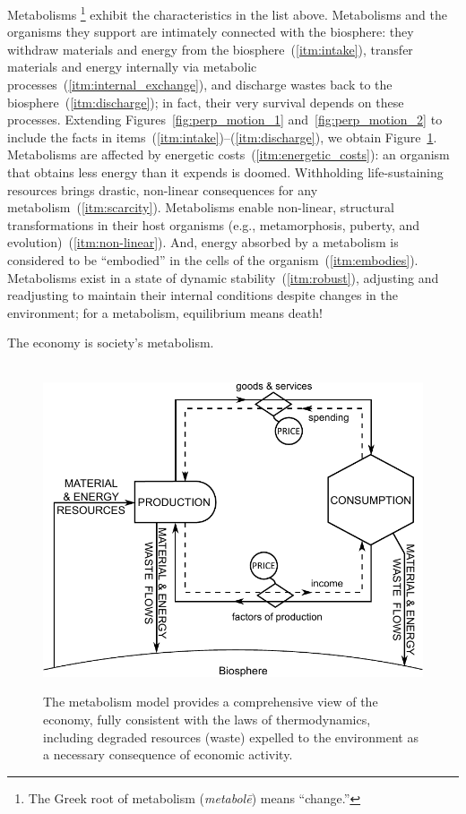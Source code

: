 Metabolisms%
	\footnote{
	The Greek root of metabolism 
	(\emph{metabol\={e}}) means ``change.''
	}
exhibit the characteristics in the list above.
Metabolisms and the organisms they support
are intimately connected with the biosphere:
they withdraw materials and energy from the biosphere~(\ref{itm:intake}), 
transfer materials and energy internally via metabolic processes~(\ref{itm:internal_exchange}),
and discharge wastes back to the biosphere~(\ref{itm:discharge});
in fact, their very survival depends on these processes.
Extending Figures~\ref{fig:perp_motion_1} and~\ref{fig:perp_motion_2}
to include the facts in items~(\ref{itm:intake})--(\ref{itm:discharge}), %
we obtain Figure~\ref{fig:metabolic_economy}.
Metabolisms are affected by energetic costs~(\ref{itm:energetic_costs}): 
an organism that obtains less energy than it expends is doomed.
Withholding life-sustaining resources brings drastic, non-linear
consequences for any metabolism~(\ref{itm:scarcity}).
Metabolisms enable non-linear, structural transformations
in their host organisms (e.g., metamorphosis, puberty, and evolution)~(\ref{itm:non-linear}).
And, energy absorbed by a metabolism is considered to be ``embodied''
in the cells of the organism~(\ref{itm:embodies}).
Metabolisms exist in a state of dynamic stability~(\ref{itm:robust}),
adjusting and readjusting to maintain their internal conditions
despite changes in the environment;
for a metabolism, equilibrium means death!

The economy is society's metabolism.

\begin{figure}[!ht]
\centering\
\includegraphics[width=\linewidth]{Part_0/Chapter_Acct_For_WoN/images/PERKS.pdf}
\caption[The metabolism model]{The metabolism model provides a comprehensive view 
of the economy, fully consistent with the laws of thermodynamics, 
including degraded resources (waste) expelled 
to the environment as a necessary consequence of economic activity.}
\label{fig:metabolic_economy}
\end{figure}

